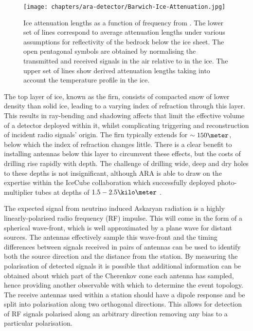 \begin{figure}[htpb]
  \texttt{[image: chapters/ara-detector/Barwich-Ice-Attenuation.jpg]}
  \caption{Ice attenuation lengths as a function of frequency from \cite{Barwick:2005-03-01T00:00:00:0022-1430:231}. The lower set of lines correspond to average attenuation lengths under various assumptions for reflectivity of the bedrock below the ice sheet. The open pentagonal symbols are obtained by normalising the transmitted and received signals in the air relative to in the ice. The upper set of lines show derived attenuation lengths taking into account the temperature profile in the ice.}
  \label{fig:ara-detector:Ice-Attenuation}
\end{figure}

The top layer of ice, known as the firn, consists of compacted snow of lower density than solid ice,  leading to a varying index of refraction through this layer. This results in ray-bending and shadowing affects that limit the effective volume of a detector deployed within it, whilst complicating triggering and reconstruction of incident radio signals' origin. The firn typically extends for $\sim 150 \meter$, below which the index of refraction changes little. There is a clear benefit to installing antennas below this layer to circumvent these effects, but the costs of drilling rise rapidly with depth. The challenge of drilling wide, deep and dry holes to these depths is not insignificant, although ARA is able to draw on the expertise within the IceCube collaboration which successfully deployed photo-multiplier tubes at depths of $1.5 - 2.5 \kilo \meter$ \cite{2010RScI...81h1101H}.


The expected signal from neutrino induced Askaryan radiation is a highly linearly-polarised radio frequency (RF) impulse. This will come in the form of a spherical wave-front, which is well approximated by a plane wave for distant sources. The antennas effectively sample this wave-front and the timing differences between signals received in pairs of antennas can be used to identify both the source direction and the distance from the station. By measuring the polarisation of detected signals it is possible that additional information can be obtained about which part of the Cherenkov cone each antenna has sampled, hence providing another observable with which to determine the event topology. The receive antennas used within a station should have a dipole response and be split into polarisation along two orthogonal directions. This allows for detection of RF signals polarised along an arbitrary direction removing any bias to a particular polarisation.

